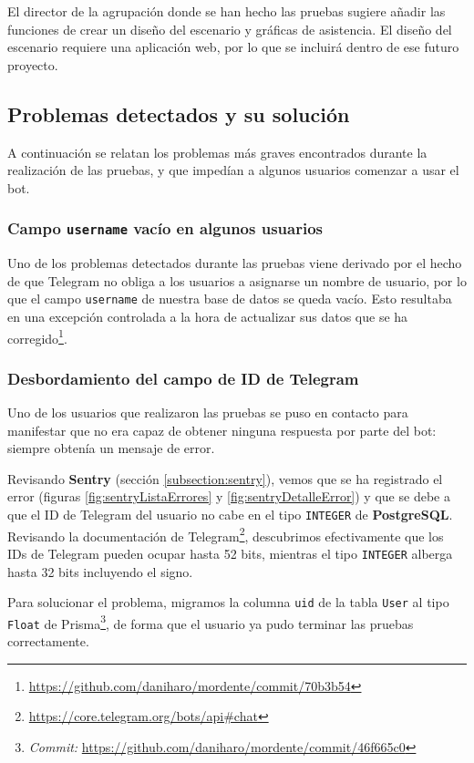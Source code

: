 El director de la agrupación donde se han hecho las pruebas sugiere añadir las funciones de crear un diseño del escenario y gráficas de asistencia. El diseño del escenario requiere una aplicación web, por lo que se incluirá dentro de ese futuro proyecto.

\subsection{Problemas detectados y su solución}\label{subsection:pruebasSoluciones}

A continuación se relatan los problemas más graves encontrados durante la realización de las pruebas, y que impedían a algunos usuarios comenzar a usar el bot.

\subsubsection{Campo \texttt{username} vacío en algunos usuarios}

Uno de los problemas detectados durante las pruebas viene derivado por el hecho de que Telegram no obliga a los usuarios a asignarse un nombre de usuario, por lo que el campo \texttt{username} de nuestra base de datos se queda vacío. Esto resultaba en una excepción controlada a la hora de actualizar sus datos que se ha corregido\footnote{\url{https://github.com/daniharo/mordente/commit/70b3b54}}.

\subsubsection{Desbordamiento del campo de ID de Telegram}

Uno de los usuarios que realizaron las pruebas se puso en contacto para manifestar que no era capaz de obtener ninguna respuesta por parte del bot: siempre obtenía un mensaje de error.

Revisando \textbf{Sentry} (sección \ref{subsection:sentry}), vemos que se ha registrado el error (figuras \ref{fig:sentryListaErrores} y \ref{fig:sentryDetalleError}) y que se debe a que el ID de Telegram del usuario no cabe en el tipo \texttt{INTEGER} de \textbf{PostgreSQL}. Revisando la documentación de Telegram\footnote{\url{https://core.telegram.org/bots/api\#chat}}, descubrimos efectivamente que los IDs de Telegram pueden ocupar hasta 52 bits, mientras el tipo \texttt{INTEGER} alberga hasta 32 bits incluyendo el signo.

Para solucionar el problema, migramos la columna \texttt{uid} de la tabla \texttt{User} al tipo \texttt{Float} de Prisma\footnote{\textit{Commit:} \url{https://github.com/daniharo/mordente/commit/46f665c0}}, de forma que el usuario ya pudo terminar las pruebas correctamente.

